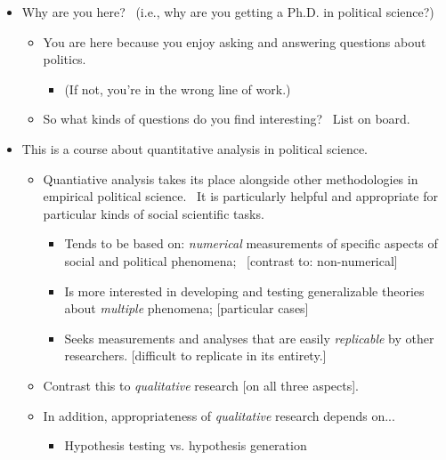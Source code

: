 \documentclass[11pt]{article}
\begin{document}
\begin{itemize}
\item Why are you here? \ (i.e., why are you getting a Ph.D. in political
science?)

\begin{itemize}
\item You are here because you enjoy asking and answering questions about
politics.

\begin{itemize}
\item (If not, you're in the wrong line of work.)
\end{itemize}

\item So what kinds of questions do you find interesting? \ List on board.
\end{itemize}

\item This is a course about quantitative analysis in political science.

\begin{itemize}
\item Quantiative analysis takes its place alongside other methodologies in
empirical political science. \ It is particularly helpful and appropriate
for particular kinds of social scientific tasks. \ 

\begin{itemize}
\item Tends to be based on: \textit{numerical }measurements of specific
aspects of social and political phenomena; \ [contrast to: non-numerical]

\item Is more interested in developing and testing generalizable theories
about \textit{multiple }phenomena; [particular cases]

\item Seeks measurements and analyses that are easily \textit{replicable }by
other researchers. [difficult to replicate in its entirety.]
\end{itemize}

\item Contrast this to \textit{qualitative }research [on all three aspects].

\item In addition, appropriateness of \textit{qualitative }research depends
on...

\begin{itemize}
\item Hypothesis testing vs. hypothesis generation


\end{itemize}
\end{itemize}
\end{itemize}
\end{document}
